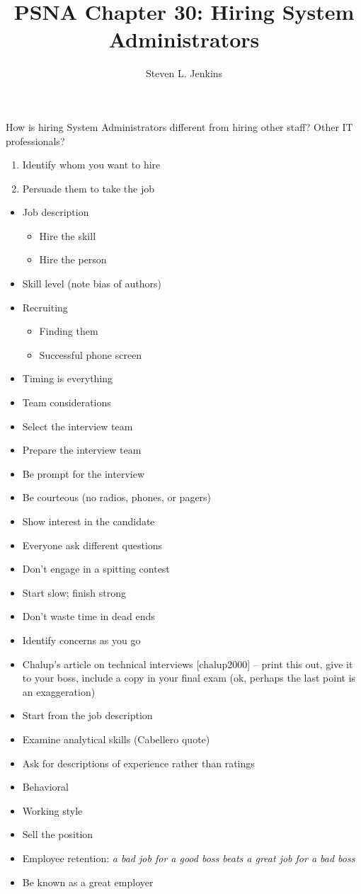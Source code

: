 \documentclass{slides}
\title{PSNA Chapter 30: Hiring System Administrators}
\author{Steven L. Jenkins}
\newcommand{\bi}{\begin{itemize}}
\newcommand{\ei}{\end{itemize}}
\newcommand{\be}{\begin{enumerate}}
\newcommand{\ee}{\end{enumerate}}
\begin{document}

How is hiring System Administrators different from hiring other staff?
Other IT professionals?


\be
\item Identify whom you want to hire
\item Persuade them to take the job
\ee


\bi
\item Job description
  \bi
  \item Hire the skill
  \item Hire the person
  \ei
\item Skill level (note bias of authors)
\item Recruiting
  \bi
  \item Finding them
  \item Successful phone screen
  \ei
\item Timing is everything 
\item Team considerations
\ei


\bi
\item Select the interview team
\item Prepare the interview team
\item Be prompt for the interview
\item Be courteous (no radios, phones, or pagers)
\item Show interest in the candidate
\item Everyone ask different questions
\item Don't engage in a spitting contest
\ei


\bi
\item Start slow; finish strong
\item Don't waste time in dead ends
\item Identify concerns as you go
\ei


\bi
\item Chalup's article on technical interviews [chalup2000] -- print this
  out, give it to your boss, include a copy in your final exam (ok,
  perhaps the last point is an exaggeration)
\item Start from the job description
\item Examine analytical skills (Cabellero quote)
\item Ask for descriptions of experience rather than ratings
\ei


\bi
\item Behavioral
\item Working style
\ei


\bi
\item Sell the position
\item Employee retention: \emph{a bad job for a good boss beats
  a great job for a bad boss}
\item Be known as a great employer
\ei
\end{document}
